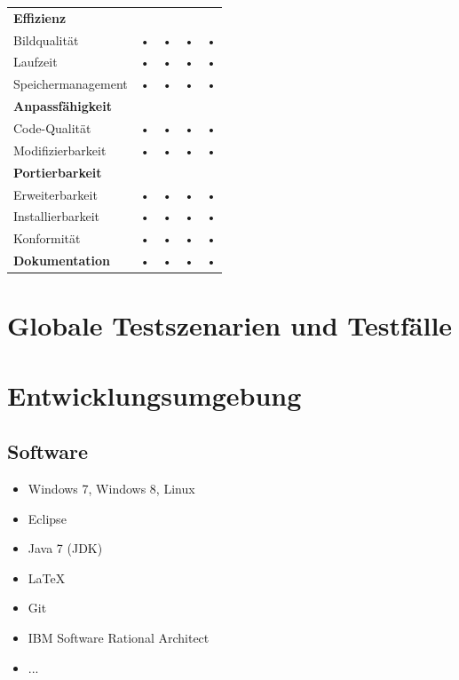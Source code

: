 \documentclass[10pt]{scrreprt}
\begin{document}
\begin{center}
\begin{tabular}{lcccc}
\hline 
\rule[-1ex]{0pt}{4ex} \textbf{Effizienz} &  &  &  &  \\ 
\rule[-1ex]{0pt}{4ex} \hspace{10pt} Bildqualität & • & • & • & • \\ 
\rule[-1ex]{0pt}{4ex} \hspace{10pt} Laufzeit & • & • & • & • \\ 
\rule[-1ex]{0pt}{4ex} \hspace{10pt} Speichermanagement & • & • & • & • \\ 

\hline 
\rule[-1ex]{0pt}{4ex} \textbf{Anpassfähigkeit} &  &  &  &  \\ 
\rule[-1ex]{0pt}{4ex} \hspace{10pt} Code-Qualität & • & • & • & • \\ 
\rule[-1ex]{0pt}{4ex} \hspace{10pt} Modifizierbarkeit & • & • & • & • \\ 

\hline 
\rule[-1ex]{0pt}{4ex} \textbf{Portierbarkeit} &  &  &  &  \\ 
\rule[-1ex]{0pt}{4ex} \hspace{10pt} Erweiterbarkeit & • & • & • & • \\ 
\rule[-1ex]{0pt}{4ex} \hspace{10pt} Installierbarkeit & • & • & • & • \\ 
\rule[-1ex]{0pt}{4ex} \hspace{10pt} Konformität & • & • & • & • \\ 

\hline 
\rule[-1ex]{0pt}{4ex} \textbf{Dokumentation} & • & • & • & • \\ 
\hline 
\end{tabular} 
\end{center}




\chapter{Globale Testszenarien und Testfälle}





\chapter{Entwicklungsumgebung}
\section{Software}
\begin{itemize}
\item Windows 7, Windows 8, Linux
\item Eclipse
\item Java 7 (JDK)
\item \LaTeX
\item Git
\item IBM Software Rational Architect
\item ...
\end{itemize}
\end{document}
